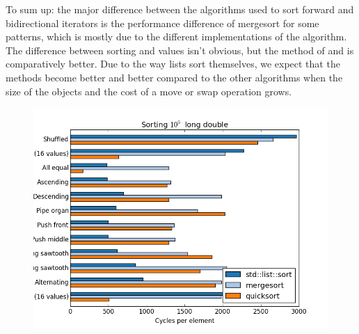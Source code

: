\documentclass{isocpp_proposal}
\begin{document}
\begin{appendices}
To sum up: the major difference between the algorithms used to sort forward and bidirectional iterators is the performance difference of mergesort for some patterns, which is mostly due to the different implementations of the algorithm. The difference between sorting  and  values isn't obvious, but the  method of  and  is comparatively better. Due to the way lists sort themselves, we expect that the  methods become better and better compared to the other algorithms when the size of the objects and the cost of a move or swap operation grows.

\begin{figure}[h]
\includegraphics[width=\textwidth]{list-long-double.png}
\end{figure}


\end{appendices}

\newpage


\end{document}
